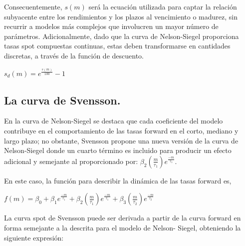 \hspace*{0.4 cm} Consecuentemente, $s(m)$ ser\'a la ecuaci\'on utilizada para captar la relaci\'on
subyacente entre los rendimientos y los plazos al vencimiento o madurez,
sin recurrir a modelos m\'as complejos que involucren un mayor n\'umero
de par\'ametros. Adicionalmente, dado que la curva de Nelson-Siegel
proporciona tasas spot compuestas continuas, estas deben transformarse
en cantidades discretas, a trav\'es de la funci\'on de descuento.


\begin{center}
$\displaystyle{s_{d}(m) = e^{\frac{s(m)}{100}} - 1}$
\end{center}

\subsection{La curva de Svensson.\\}

\hspace*{0.4 cm} En la curva de Nelson-Siegel se destaca que cada coeficiente del modelo
contribuye en el comportamiento de las tasas forward en el corto,
mediano y largo plazo; no obstante, Svensson \cite{Sv} propone una nueva
versi\'on de la curva de Nelson-Siegel donde un cuarto t\'ermino es incluido
para producir un efecto adicional y semejante al proporcionado por:
$\beta_{2}(\frac{m}{\tau_{1}})e^{\frac{-m}{\tau_{1}}}$.

\hspace*{0.4 cm} En este caso, la funci\'on para describir la din\'amica de las tasas forward es,

\vspace*{0.2 cm}

\begin{center}
$\displaystyle{f(m) = \beta_{0} + \beta_{1} e^{\frac{-m}{\tau_{1}}} +\beta_{2} \left(\frac{m}{\tau_{1}}\right)e^{\frac{-m}{\tau_{1}}} + \beta_{3}\left(\frac{m}{\tau_{2}}\right)e^{\frac{-m}{\tau_{2}}} }$
\end{center}

\vspace*{0.2 cm}

\hspace*{0.4 cm} La curva spot de Svensson puede ser derivada a partir de la curva
forward en forma semejante a la descrita para el modelo de Nelson-
Siegel, obteniendo la siguiente expresi\'on:

\vspace*{0.2 cm}

